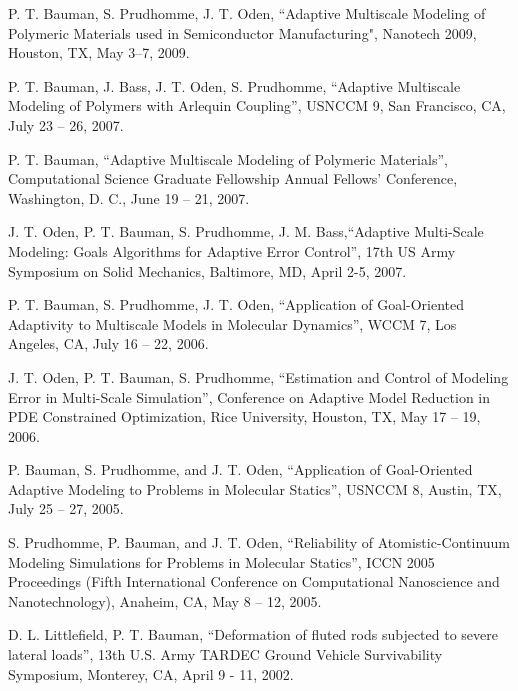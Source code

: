 \documentclass[12pt]{article}
\newcommand{\blankline}{\quad\pagebreak[2]}
\begin{document}
P. T. Bauman, S. Prudhomme, J. T. Oden, ``Adaptive Multiscale Modeling of Polymeric Materials 
used in Semiconductor Manufacturing", Nanotech 2009, Houston, TX, May 3--7, 2009.

\blankline

P. T. Bauman, J. Bass, J. T. Oden, S. Prudhomme, ``Adaptive Multiscale Modeling of Polymers with Arlequin Coupling'', USNCCM 9, San Francisco, CA, July 23 -- 26, 2007.

\blankline

P. T. Bauman, ``Adaptive Multiscale Modeling of Polymeric Materials'', Computational Science Graduate Fellowship Annual Fellows' Conference, Washington, D. C., June 19 -- 21, 2007.

\blankline

J. T. Oden, P. T. Bauman, S. Prudhomme, J. M. Bass,``Adaptive Multi-Scale Modeling: Goals Algorithms for Adaptive Error Control'', 17th US Army Symposium on Solid Mechanics, Baltimore, MD, April 2-5, 2007.

\blankline

P. T. Bauman, S. Prudhomme, J. T. Oden, ``Application of Goal-Oriented Adaptivity to Multiscale Models in Molecular Dynamics'', WCCM 7, Los Angeles, CA, July 16 -- 22, 2006.

\blankline

J. T. Oden, P. T. Bauman, S. Prudhomme, ``Estimation and Control of Modeling Error in Multi-Scale Simulation'', Conference on Adaptive Model Reduction in PDE Constrained Optimization, Rice University, Houston, TX, May 17 -- 19, 2006.

\blankline

P. Bauman, S. Prudhomme, and J. T. Oden, ``Application of Goal-Oriented Adaptive Modeling to Problems in Molecular Statics'', USNCCM 8, Austin, TX, July 25 -- 27, 2005.

\blankline 

S. Prudhomme, P. Bauman, and J. T. Oden, ``Reliability of Atomistic-Continuum Modeling Simulations for Problems in Molecular Statics'', ICCN 2005 Proceedings (Fifth International Conference on Computational Nanoscience and Nanotechnology), Anaheim, CA, May 8 -- 12, 2005.

\blankline

D. L. Littlefield, P. T. Bauman, ``Deformation of fluted rods subjected to severe lateral loads'', 13th U.S. Army TARDEC Ground Vehicle Survivability Symposium, Monterey, CA, April 9 - 11, 2002.

\end{document}
